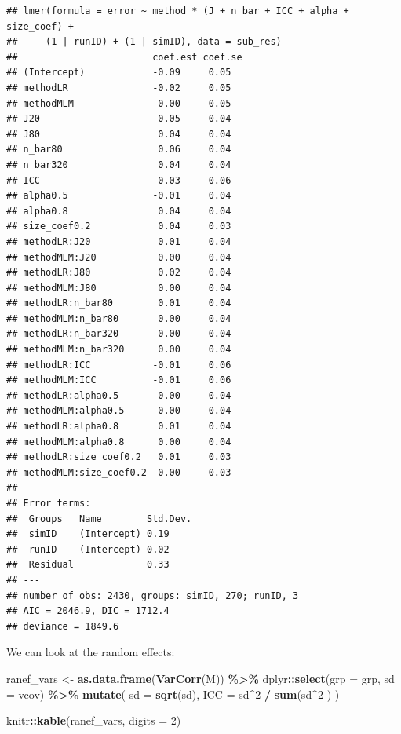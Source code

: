 \documentclass[
]{book}
\newenvironment{Shaded}{\begin{snugshade}}{\end{snugshade}}
\newcommand{\AttributeTok}[1]{\textcolor[rgb]{0.13,0.29,0.53}{#1}}
\newcommand{\DecValTok}[1]{\textcolor[rgb]{0.00,0.00,0.81}{#1}}
\newcommand{\FunctionTok}[1]{\textcolor[rgb]{0.13,0.29,0.53}{\textbf{#1}}}
\newcommand{\NormalTok}[1]{#1}
\newcommand{\OtherTok}[1]{\textcolor[rgb]{0.56,0.35,0.01}{#1}}
\newcommand{\SpecialCharTok}[1]{\textcolor[rgb]{0.81,0.36,0.00}{\textbf{#1}}}
\begin{document}
\begin{verbatim}
## lmer(formula = error ~ method * (J + n_bar + ICC + alpha + size_coef) + 
##     (1 | runID) + (1 | simID), data = sub_res)
##                        coef.est coef.se
## (Intercept)            -0.09     0.05  
## methodLR               -0.02     0.05  
## methodMLM               0.00     0.05  
## J20                     0.05     0.04  
## J80                     0.04     0.04  
## n_bar80                 0.06     0.04  
## n_bar320                0.04     0.04  
## ICC                    -0.03     0.06  
## alpha0.5               -0.01     0.04  
## alpha0.8                0.04     0.04  
## size_coef0.2            0.04     0.03  
## methodLR:J20            0.01     0.04  
## methodMLM:J20           0.00     0.04  
## methodLR:J80            0.02     0.04  
## methodMLM:J80           0.00     0.04  
## methodLR:n_bar80        0.01     0.04  
## methodMLM:n_bar80       0.00     0.04  
## methodLR:n_bar320       0.00     0.04  
## methodMLM:n_bar320      0.00     0.04  
## methodLR:ICC           -0.01     0.06  
## methodMLM:ICC          -0.01     0.06  
## methodLR:alpha0.5       0.00     0.04  
## methodMLM:alpha0.5      0.00     0.04  
## methodLR:alpha0.8       0.01     0.04  
## methodMLM:alpha0.8      0.00     0.04  
## methodLR:size_coef0.2   0.01     0.03  
## methodMLM:size_coef0.2  0.00     0.03  
## 
## Error terms:
##  Groups   Name        Std.Dev.
##  simID    (Intercept) 0.19    
##  runID    (Intercept) 0.02    
##  Residual             0.33    
## ---
## number of obs: 2430, groups: simID, 270; runID, 3
## AIC = 2046.9, DIC = 1712.4
## deviance = 1849.6
\end{verbatim}

We can look at the random effects:

\begin{Shaded}
\begin{Highlighting}[]
\NormalTok{ranef\_vars }\OtherTok{\textless{}{-}}
  \FunctionTok{as.data.frame}\NormalTok{(}\FunctionTok{VarCorr}\NormalTok{(M)) }\SpecialCharTok{\%\textgreater{}\%}
\NormalTok{  dplyr}\SpecialCharTok{::}\FunctionTok{select}\NormalTok{(}\AttributeTok{grp =}\NormalTok{ grp, }\AttributeTok{sd =}\NormalTok{ vcov) }\SpecialCharTok{\%\textgreater{}\%}
  \FunctionTok{mutate}\NormalTok{( }\AttributeTok{sd =} \FunctionTok{sqrt}\NormalTok{(sd),}
          \AttributeTok{ICC =}\NormalTok{ sd}\SpecialCharTok{\^{}}\DecValTok{2} \SpecialCharTok{/} \FunctionTok{sum}\NormalTok{(sd}\SpecialCharTok{\^{}}\DecValTok{2}\NormalTok{ ) )}

\NormalTok{knitr}\SpecialCharTok{::}\FunctionTok{kable}\NormalTok{(ranef\_vars, }\AttributeTok{digits =} \DecValTok{2}\NormalTok{)}
\end{Highlighting}
\end{Shaded}
\end{document}
